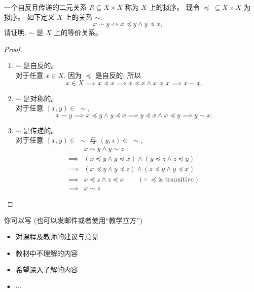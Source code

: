 \documentclass[a4paper, justified]{tufte-handout}
\begin{document}
\begin{problem}
  一个自反且传递的二元关系 $R \subseteq X \times X$
  称为 $X$ 上的拟序。
  现令 $\preceq\; \subseteq X \times X$ 为拟序。
  如下定义 $X$ 上的关系 $\sim$:
  \[
    x \sim y \iff x \preceq y \land y \preceq x,
  \]
  请证明, $\sim$ 是 $X$ 上的等价关系。
\end{problem}

\begin{proof}
  \begin{enumerate}[(1)]
    \item $\sim$ 是自反的。\\
      对于任意 $x \in X$, 因为 $\preceq$ 是自反的, 所以
      \[
        x \in X \implies x \preceq x \implies x \preceq x \land x \preceq x
        \implies x \sim x.
      \]
    \item $\sim$ 是对称的。\\
      对于任意 $(x, y) \in \;\sim$,
      \[
        x \sim y \implies x \preceq y \land y \preceq x
        \implies y \preceq x \land x \preceq y \implies y \sim x.
      \]
    \item $\sim$ 是传递的。\\
      对于任意 $(x, y) \in \;\sim$ 与 $(y, z) \in \;\sim$,
      \begin{align*}
        & x \sim y \land y \sim z \\[6pt]
        \implies & (x \preceq y \land y \preceq x) \land (y \preceq z \land z \preceq y) \\[6pt]
        \implies & (x \preceq y \land y \preceq z) \land (z \preceq y \land y \preceq x) \\[6pt]
        \implies & x \preceq z \land z \preceq x \qquad (\because \;\preceq \text{is transitive})\\[6pt]
        \implies & x \sim z
      \end{align*}
  \end{enumerate}
\end{proof}

\begincorrection

\beginfb

你可以写 (也可以发邮件或者使用``教学立方'')
\begin{itemize}
  \item 对课程及教师的建议与意见
  \item 教材中不理解的内容
  \item 希望深入了解的内容
  \item $\cdots$
\end{itemize}
\end{document}
